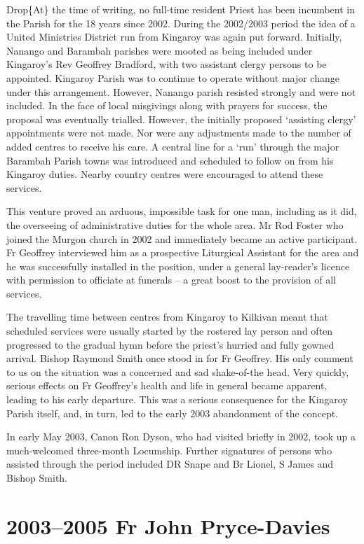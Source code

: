 Drop\{At\} the time of writing, no full-time resident Priest has been incumbent in the Parish for the 18 years since 2002. During the 2002/2003 period the idea of a United Ministries District run from Kingaroy was again put forward. Initially, Nanango and Barambah parishes were mooted as being included under Kingaroy's Rev Geoffrey Bradford, with two assistant clergy persons to be appointed. Kingaroy Parish was to continue to operate without major change under this arrangement. However, Nanango parish resisted strongly and were not included. In the face of local misgivings along with prayers for success, the proposal was eventually trialled. However, the initially proposed `assisting clergy' appointments were not made. Nor were any adjustments made to the number of added centres to receive his care. A central line for a `run' through the major Barambah Parish towns was introduced and scheduled to follow on from his Kingaroy duties. Nearby country centres were encouraged to attend these services.

This venture proved an arduous, impossible task for one man, including as it did, the overseeing of administrative duties for the whole area. Mr Rod Foster who joined the Murgon church in 2002 and immediately became an active participant. Fr Geoffrey interviewed him as a prospective Liturgical Assistant for the area and he was successfully installed in the position, under a general lay-reader's licence with permission to officiate at funerals -- a great boost to the provision of all services.

The travelling time between centres from Kingaroy to Kilkivan meant that scheduled services were usually started by the rostered lay person and often progressed to the gradual hymn before the priest's hurried and fully gowned arrival. Bishop Raymond Smith once stood in for Fr Geoffrey. His only comment to us on the situation was a concerned and sad shake-of-the head. Very quickly, serious effects on Fr Geoffrey's health and life in general became apparent, leading to his early departure. This was a serious consequence for the Kingaroy Parish itself, and, in turn, led to the early 2003 abandonment of the concept.

In early May 2003, Canon Ron Dyson, who had visited briefly in 2002, took up a much-welcomed three-month Locumship. Further signatures of persons who assisted through the period included DR Snape and Br Lionel, S James and Bishop Smith.

\hypertarget{fr-john-pryce-davies}{%
\section{2003--2005 Fr John Pryce-Davies}\label{fr-john-pryce-davies}}

